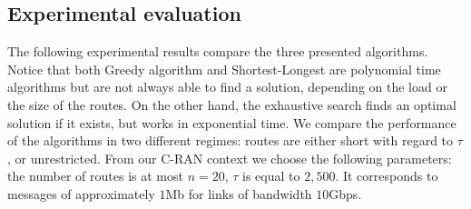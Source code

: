 \documentclass[10pt, conference, letterpaper]{IEEEtran}
\begin{document}
%        
%        
%        
%       
   
   
   
   \subsection{Experimental evaluation}\label{sec:exp_PAZL}
      The following experimental results compare the three presented algorithms.
      Notice that both Greedy algorithm and Shortest-Longest are polynomial time algorithms but are not always able to find a solution, depending on the load or the size of the routes. On the other hand, the exhaustive search finds an optimal solution if it exists, but works in exponential time. We compare the performance of the algorithms in two different regimes: routes are either short with regard to $\tau$, or unrestricted.
      From our C-RAN context we choose the following parameters: the number of routes is at most $n = 20$, $\tau$ is equal to $2,500$.
      It corresponds to messages of approximately $1$Mb for links of bandwidth $10$Gbps.
\end{document}
